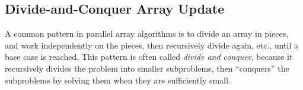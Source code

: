 \begin{comment}
\subsubsection{Algorithm Example:  International Data Encryption Algorithm (IDEA)%
\label{sec:array:blocked:idea}}

Now we show how the Blocked Array Update pattern can be used to
parallelize the International Data Encryption Algorithm (IDEA).  IDEA
is a block cipher code that was designed as a replacement for the Data
Encryption Standard (DES).  It operates on 64 bit blocks using a 128
bit key using a series of eight transformations.  We use Blocked Array
Update because the algorithm requires that the blocking structure be
explicit in the code, and not hidden in the runtime.

TODO: EXPLAIN FIGURE

\begin{figure}
\begin{numbereddpjlisting}
// slice has the number of blocks.
  DPJPartitionByte<R1> inSegs  = DPJPartitionByte.stridedPartition(plain1, slice);
  DPJPartitionByte<R2> outSegs = DPJPartitionByte.stridedPartition(crypt1, slice);
  foreach (int i in 0, inSegs.length)
  {
    DPJArrayByte<inSegs:[i]:*>inSeg = inSegs.get(i);
    DPJArrayByte<outSegs:[i]:*>outSeg = outSegs.get(i);
    run1(0, inSeg.length, inSeg, outSeg, Z); // do the encryption
  }

\end{numbereddpjlisting}
\caption{Blocked Array Update in IDEA.}
\label{fig:array:idea}
\end{figure}
\end{comment}

\subsection{Divide-and-Conquer Array Update%
\label{sec:array:dandc}}

A common pattern in parallel array algorithms is to divide an array in
pieces, and work independently on the pieces, then recursively divide
again, etc., until a base case is reached.  This pattern is often
called \emph{divide and conquer}, because it recursively divides the
problem into smaller subproblems, then ``conquers'' the subproblems by
solving them when they are sufficiently small.


